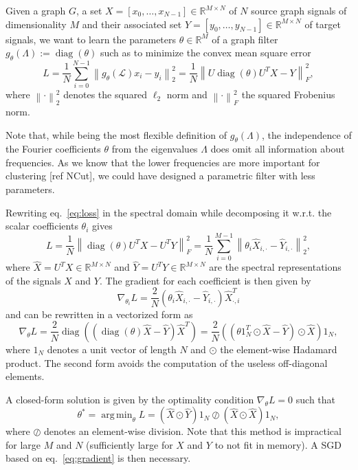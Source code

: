 \documentclass{article}
\DeclareMathOperator*{\diag}{diag}
\DeclareMathOperator*{\argmin}{arg\,min}
\renewcommand{\L}{\mathcal{L}}
\newcommand{\R}{\mathbb{R}}
\newcommand{\Xh}{\hat{X}}
\newcommand{\Yh}{\hat{Y}}
\newcommand{\norm}[1]{\left\| #1 \right\|}
\begin{document}
Given a graph \(G\), a set
\(X = [x_0, \ldots, x_{N-1}] \in \R^{M \times N}\) of \(N\) source graph
signals of dimensionality \(M\) and their associated set
\(Y = [y_0, \ldots, y_{N-1}] \in \R^{M \times N}\) of target signals, we
want to learn the parameters \(\theta \in \R^M\) of a graph filter
\(g_\theta(\Lambda) := \diag(\theta)\) such as to minimize the convex
mean square error \begin{equation} L =
\frac{1}{N} \sum_{i=0}^{N-1} \norm{ g_\theta(\L) x_i - y_i }_2^2 =
\frac{1}{N} \norm{ U \diag(\theta) U^T X - Y }_F^2, \label{eq:loss}\end{equation}
where \(\norm{\cdot}_2^2\) denotes the squared \(\ell_2\) norm and
\(\norm{\cdot}_F^2\) the squared Frobenius norm.

Note that, while being the most flexible definition of
\(g_\theta(\Lambda)\), the independence of the Fourier coefficients
\(\theta\) from the eigenvalues \(\Lambda\) does omit all information
about frequencies. As we know that the lower frequencies are more
important for clustering {[}ref NCut{]}, we could have designed a
parametric filter with less parameters.

Rewriting eq.~\ref{eq:loss} in the spectral domain while decomposing it
w.r.t. the scalar coefficients \(\theta_i\) gives \[ L =
\frac{1}{N} \norm{ \diag(\theta) U^T X - U^T Y }_F^2 =
\frac{1}{N} \sum_{i=0}^{M-1} \norm{\theta_i\Xh_{i,\cdot}-\Yh_{i,\cdot}}_2^2, \]
where \(\Xh = U^TX \in \R^{M \times N}\) and
\(\Yh = U^TY \in \R^{M \times N}\) are the spectral representations of
the signals \(X\) and \(Y\). The gradient for each coefficient is then
given by \[ \nabla_{\theta_i} L =
\frac{2}{N} ( \theta_i \Xh_{i,\cdot} - \Yh_{i,\cdot} ) \Xh^T_{\cdot,i} \]
and can be rewritten in a vectorized form as
\begin{equation} \nabla_{\theta} L =
\frac{2}{N} \diag \left( (\diag(\theta) \Xh - \Yh) \Xh^T \right) =
\frac{2}{N} \left( ( \theta 1_N^T \odot \Xh - \Yh ) \odot \Xh \right) 1_N,
\label{eq:gradient}\end{equation} where \(1_N\) denotes a unit vector of
length \(N\) and \(\odot\) the element-wise Hadamard product. The second
form avoids the computation of the useless off-diagonal elements.

A closed-form solution is given by the optimality condition
\(\nabla_{\theta}L=0\) such that
\begin{equation} \theta^* = \argmin_\theta L =
(\Xh \odot \Yh) 1_N \oslash (\Xh \odot \Xh) 1_N, \label{eq:direct}\end{equation}
where \(\oslash\) denotes an element-wise division. Note that this
method is impractical for large \(M\) and \(N\) (sufficiently large for
\(X\) and \(Y\) to not fit in memory). A \gls{SGD} based on
eq.~\ref{eq:gradient} is then necessary.
\end{document}
